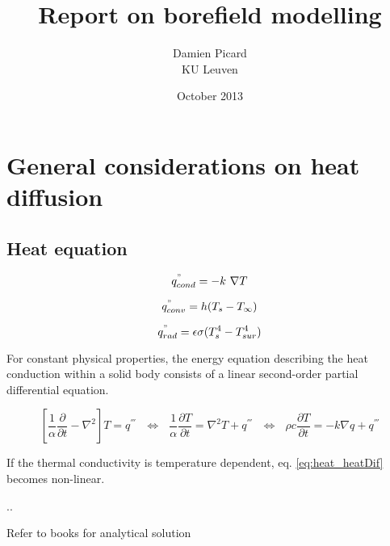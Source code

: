 \documentclass[a4paper,oneside,11pt]{report}
\begin{document}
\title{Report on borefield modelling}
\date{October 2013}
\author{Damien Picard\\ KU Leuven}
        
\maketitle

\tableofcontents

\chapter{General considerations on heat diffusion} \label{chap:heat}

\section{Heat equation} \label{sec:heat_heatEqu}

\begin{equation} \label{eq:heat_Fou}
	q_{cond}^{"} = -k \ \nabla T
\end{equation}

\begin{equation} \label{eq:heat_conv}
	q_{conv}^{"} = h ( T_s - T_\infty )
\end{equation}

\begin{equation} \label{eq:heat_rad}
	q_{rad}^{"} = \epsilon \sigma ( T_s^4 - T_{sur}^4 )
\end{equation}

For constant physical properties, the energy equation describing the heat conduction within a solid body consists of a linear second-order partial differential equation.

\begin{equation} \label{eq:heat_heatDif}
	\left[ \frac{1}{\alpha} \frac{\partial}{\partial t} - \nabla^2 \right] T = q^{'''} \ \ \ \Leftrightarrow \ \ \ \frac{1}{\alpha} \frac{\partial T}{\partial t} = \nabla^2 T + q^{'''}  \ \ \ \Leftrightarrow \ \ \ \rho c \frac{\partial T}{\partial t} = - k \nabla q + q^{'''}
\end{equation}

If the thermal conductivity is temperature dependent, eq. \ref{eq:heat_heatDif} becomes non-linear.

..

Refer to books for analytical solution
\end{document}
